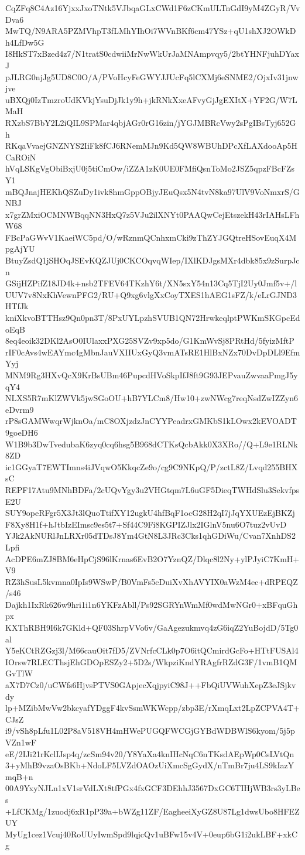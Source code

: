CqZFq8C4Az16YjxxJxoTNtk5VJbqaGLxCWd1F6zCKmULTnGdI9yM4ZGyR/VvDva6
MwTQ/N9ARA5PZMVhpT3fLMhYIhOi7WVnBKf6cm47YSz+qU1shXJ2OWkDh4LfDw5G
I8HkST7xBzed4z7/N1tratS0cdwiiMrNwWkUrJaMNAmpvqy5/2btYHNFjuhDYaxJ
pJLRG0njJg5UD8C0O/A/PVoHcyFeGWYJJUcFq5lCXMj6eSNME2/OjxIv31jnwjve
uBXQj0IzTmzroUdKVkjYsuDjJk1y9h+jkRNkXxeAFvyGjJgEXItX+YF2G/W7LMaH
RXzbS7BbY2L2iQIL9SPMar4qbjAGr0rG16zin/jYGJMBRcVwy2sPgIBsTyj652Gh
RKqaVvaejGNZNYS2IiFk8fCJ6RNemMJn9Kd5QW8WBUhDPcXfLAXdooAp5HCaROiN
hVqLSKgVgObiBxjU0j5tiCmOw/iZZA1zK0UE0FMfiQsnToMo2JSZ5qpzFBcFZsY1
mBQJnajHEKhQSZuDy1ivk8hmGppOBjyJEuQsx5N4tvN8ka97UlV9VoNmxrS/GNBJ
x7grZMxiOCMNWBqqNN3HxQ7z5VJu2ilXNYt0PAAQwCejEtszekH43rIAHsLFhW68
FBcPaGWvV1KaeiWC5pd/O/wRznmQCnhxmCki9zThZYJGQtreHSovEuqX4MpgAjYU
BtuyZsdQ1jSHOqJSEvKQZJUj0CKCOqvqWIep/IXlKDJgsMXr4dbk85x9zSurpJcn
GSijHZPifZ18JD4k+nsb2TFEV64TKzhY6t/XN5sxY54n13Cq5TjI2Uy0Jmf5v+/l
UUV7v8NxKhVewnPFG2/RU+Q9xg6vlgXxCoyTXES1hAEG1sFZ/k/eLrGJND3HTfJk
kniXkvoBTTHsz9Qn0pn3T/8PxUYLpzhSVUB1QN72HrwkeqlptPWKmSKGpcEdoEqB
8eq4eoik32DKl2AsO0IUlaxxPXG25SVZv9xp5do/G1KmWvSj8PRtHd/5fyizMftP
rIF0cAvs4wEAYmc4gMbnJauVXIIUxGyQ3vmATsRE1HlBxNZx70DvDpDLl9EfmYyj
MNM9Rg3HXvQcX9KrBsUBm46PupcdHVoSkpIfJ8ft9G93JEPvauZwvaaPmgJ5yqY4
NLXS5R7mKlZWVk5jwSGoOU+hB7YLCm8/Hw10+zwNWcg7reqNsdZwIZZyn6eDvrm9
rP8sGAMWwqrWjknOa/mC8OXjzdzJnCYYPeadrxGMKbS1kLOwx2kEVOADT9goeDH6
W1B9b3DwTvedubaK6zyq0cq6hsg5B968dCTKsQcbAkk0X3XRo//Q+L9e1RLNk8ZD
ic1GGyaT7EWTImns4iJVqwO5KkqcZe9o/cg9C9NKpQ/P/zctL8Z/Lvqd255BHXsC
REPF17Atu9MNhBDFa/2cUQvYgy3u2VHGtqm7L6uGF5DieqTWHdSlu3SekvfpsE2U
SUY9opeRFgr5X3Jt3lQuoTtifXY12ugkU4hfBqF1ocG28H2qI7jJqYXUEzEjBKZj
F8Xy8H1f+hJtbIzEImsc9es5t7+Sf44C9Fi8KGPIZJlx2IGlnV5nu6O7tuz2vUvD
YJk2AkNURlJnLRXr05dTDsJ8Ym4GtN8L3JRc3Cks1qhGDiWu/Cvan7XnhDS2Lpfi
AcDPE6mZJ8BM6eHpCjS96lKrnas6EvB2O7YznQZ/Dlqc8l2Ny+ylPJyiC7KmH+V9
RZ3hSusL5kvmna0IpIs9WSwP/B0VmFs5cDuiXvXhAVYIX0aWzM4ec+dRPEQZ/s46
Dajkh1IxRk626w9hri1i1n6YKFzAbll/Ps92SGRYnWmMf0wdMwNGr0+xBFquGhpx
KXThRBH9I6k7GKld+QF03ShrpVVo6v/GaAgezukmvq4zG6iqZ2YuBojdD/5Tg0al
Y5eKCtRZGzj3l/M66cauOit7fD5/ZVNrfcCLk0p7O6itQCmirdGcFo+HTtFUSAl4
IOrsw7RLECThsjEhGDOpESZy2+5D2s/WkpziKndYRAgfrRZdG3F/1vmB1QMGvTlW
aX7D7Cz0/uCWfs6HjvsPTVS0GApjecXqjpyiC98J++FbQiUVWuhXepZ3eJSjkvdy
lp+MZibMwVw2bkcyafYDggF4kvSsmWKWcpp/zbp3E/rXmqLxt2LpZCPVA4T+CJsZ
i9/vSh8pLfu1L02P8aV518VH4mHWePUGQFWCGjGYBdWDBWlS6kyom/5j5pVZn1wF
eE/2IJi21rKclIJsp4q/zcSm94v20/Y8YaXa4knIHcNqC6nTKsdAEpWp0CsLVtQn
3+yMhB9vzaOsBKb+NdoLF5LVZdOAOzUiXmcSgGydX/nTmBr7ju4LS9kIazYmqB+n
00A9YxyNJLn1xV1srVdLXt8tfPGx4fxGCF3DEhhJ3567DxGC6TIHjWB3rs3yLBes
+LfCKMg/1zuodj6xR1pP39a+bWZg11ZF/EagheeiXyGZ8U87Lg1dwsUbo8HFEZUY
MyUg1cez1Vcuj40RoUUyIwmSpd9lqjcQv1uBFw15v4V+0eup6bG1i2ukLBF+xkCg
